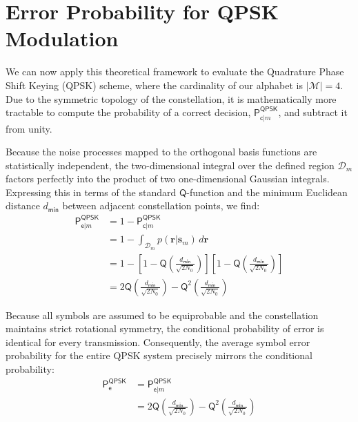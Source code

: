 \section{Error Probability for QPSK Modulation}

We can now apply this theoretical framework to evaluate the Quadrature Phase Shift Keying (QPSK) scheme, where the cardinality of our alphabet is $|\mathcal{M}| = 4$. Due to the symmetric topology of the constellation, it is mathematically more tractable to compute the probability of a correct decision, $\mathsf{P}_{\mathsf{c}|m}^{\mathsf{QPSK}}$, and subtract it from unity. 

Because the noise processes mapped to the orthogonal basis functions are statistically independent, the two-dimensional integral over the defined region $\mathcal{D}_m$ factors perfectly into the product of two one-dimensional Gaussian integrals. Expressing this in terms of the standard $\mathsf{Q}$-function and the minimum Euclidean distance $d_{\mathsf{min}}$ between adjacent constellation points, we find:
\begin{align*}
    \mathsf{P}_{\mathsf{e}|m}^{\mathsf{QPSK}} &= 1 - \mathsf{P}_{\mathsf{c}|m}^{\mathsf{QPSK}} \\
                                              &= 1 - \int_{\mathcal{D}_m} p(\bm{r}|\bm{s}_m) \, d\bm{r} \\
                                              &= 1 - \left[1 - \mathsf{Q}\left(\frac{d_{\mathsf{min}}}{\sqrt{2N_0}}\right)\right]\left[1 - \mathsf{Q}\left(\frac{d_{\mathsf{min}}}{\sqrt{2N_0}}\right)\right] \\
                                              &= 2\mathsf{Q}\left(\frac{d_{\mathsf{min}}}{\sqrt{2N_0}}\right) - \mathsf{Q}^2\left(\frac{d_{\mathsf{min}}}{\sqrt{2N_0}}\right)
\end{align*}

Because all symbols are assumed to be equiprobable and the constellation maintains strict rotational symmetry, the conditional probability of error is identical for every transmission. Consequently, the average symbol error probability for the entire QPSK system precisely mirrors the conditional probability:
\begin{align*}
    \mathsf{P}_{\mathsf{e}}^{\mathsf{QPSK}} &= \mathsf{P}_{\mathsf{e}|m}^{\mathsf{QPSK}} \\
                                            &= 2\mathsf{Q}\left(\frac{d_{\mathsf{min}}}{\sqrt{2N_0}}\right) - \mathsf{Q}^2\left(\frac{d_{\mathsf{min}}}{\sqrt{2N_0}}\right)
\end{align*}

